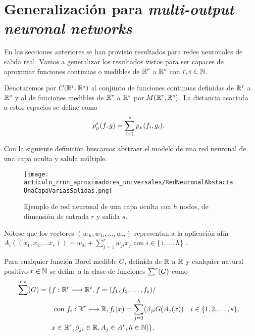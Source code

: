 %
\section{Generalización para \textit{multi-output neuronal networks}}

En las secciones anteriores se han provisto resultados para redes 
neuronales de salida real. Vamos a generalizar los resultados vistos
para ser capaces de aproximar funciones continuas o medibles 
de $\mathbb{R}^r$ a $\mathbb{R}^s$ con $r,s \in \mathbb{N}.$

Denotaremos por $C(\mathbb{R}^r ,\mathbb{R}^s)$ al conjunto de funciones continuas definidas de $\mathbb{R}^r$ a $\mathbb{R}^s$ y al de funciones medibles de 
$\mathbb{R}^r$ a $\mathbb{R}^s$  por $M(\mathbb{R}^r , \mathbb{R}^s).$ 
La distancia asociada a estos espacios se define como 
\begin{equation}
    \rho_{\mu}^s(f,g) 
    =
    \sum_{i=1}^s \rho_{\mu}(f_i, g_i).
\end{equation}

Con la siguiente definición buscamos abstraer el modelo de una red neuronal de una capa oculta y salida múltiple.
\begin{figure}[h]
    \centering
    \texttt{[image: articulo\_rrnn\_aproximadores\_universales/RedNeuronalAbstactaUnaCapaVariasSalidas.png]}
    \caption{Ejemplo de red neuronal de una capa oculta con $h$ nodos, de dimensión de entrada $r$ y salida $s$.}
    \label{fig:red neuronal-r-h-s}
\end{figure}

Nótese que los vectores $(w_{0i},w_{1 i}, \ldots, w_{r i})$ representan a la aplicación afín 
$A_i((x_1, x_2, \ldots x_r)) = w_{0i} + \sum_{j=1}^r w_{ji} x_j$
con $i \in \{1,\ldots, h\}$ . 

\begin{definicion} 
    Para cualquier función Borel medible $G$, definida de $\mathbb{R}$ a $\mathbb{R}$ y cualquier natural positivo
    $r \in \mathbb{N}$ se define a la clase de funciones $\sum ^r (G)$ como 
    \begin{equation}
        \begin{split}
        \sum^{r,s}(G) = 
        \{ 
            & f: \mathbb{R} ^r \longrightarrow \mathbb{R}^s, f= (f_1, f_2, \ldots, f_s)  / \quad 
            \\ &
            \text{ con } f_i : \mathbb{R} ^r\longrightarrow \mathbb{R}, 
            f_i(x)=\sum_{j = 1} ^h (
            \beta_{j i} G(A_{j}(x)) \quad i \in \{1,2,\ldots, s\}, \\
            & x  \in \mathbb{R} ^r, \beta_{j i} \in \mathbb{R}, A_{j}\in A^r,h \in \mathbb{N}
            )
        \}.
        \end{split}
    \end{equation}
\end{definicion}

